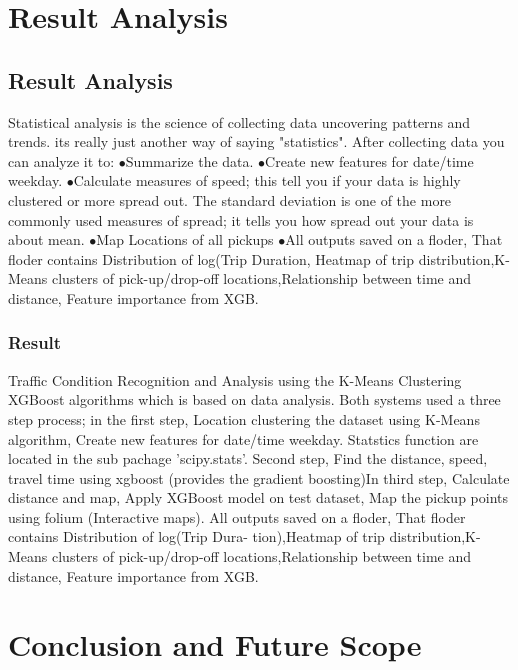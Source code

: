 \documentclass[12pt,report]{ucdavisthesis}
\begin{document}
     \chapter{Result Analysis}\label{chp:chapter}
     \section{Result Analysis}
\hspace{2cm}Statistical analysis is the science of collecting data uncovering patterns and trends. its really just another way of saying "statistics". After collecting data you can analyze it to:
 \newline $\bullet$Summarize the data.
 \newline $\bullet$Create new features for date/time   weekday.
 \newline $\bullet$Calculate measures of speed; this tell you if your data is highly clustered or more spread out. The standard deviation is one of the more commonly used measures of spread; it tells you how spread out your data is about mean.
 \newline $\bullet$Map Locations of all pickups
 \newpage $\bullet$All outputs saved on a floder, That floder contains Distribution of log(Trip Duration, Heatmap of trip distribution,K-Means clusters of pick-up/drop-off locations,Relationship between time and distance, Feature importance from XGB.
 \subsection{Result}
  \hspace{2cm}Traffic Condition Recognition and Analysis using  the K-Means Clustering XGBoost algorithms which is based on data analysis. Both systems used a three step process; in the first step, Location clustering the dataset using K-Means algorithm, Create new features for date/time weekday. Statstics function are located in the sub pachage 'scipy.stats'. Second step, Find the distance, speed, travel time using xgboost (provides the gradient boosting)In third step, Calculate distance and map, Apply XGBoost model on test dataset, Map the pickup points using folium (Interactive maps). All outputs saved on a floder, That floder contains Distribution of log(Trip Dura-
tion),Heatmap of trip distribution,K-Means clusters of pick-up/drop-off locations,Relationship
between time and distance, Feature importance from XGB.

    \chapter{Conclusion and Future Scope}\label{chp:chapter}
\end{document}
